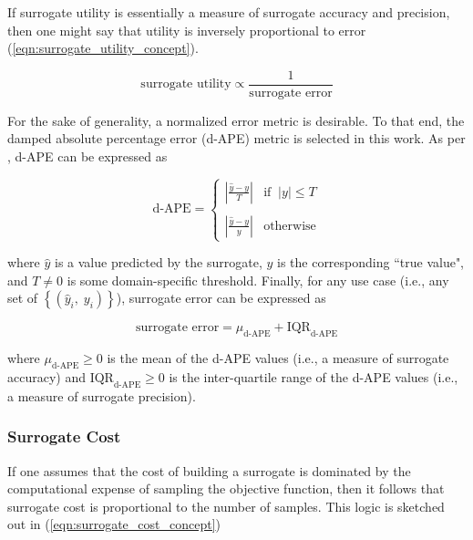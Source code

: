 \documentclass[conference]{IEEEtran}
\begin{document}
If surrogate utility is essentially a measure of surrogate accuracy and precision, then one might say that utility is inversely proportional to error (\ref{eqn:surrogate_utility_concept}).

\begin{equation}
	\textrm{surrogate utility} \propto \frac{1}{\textrm{surrogate error}}
	\label{eqn:surrogate_utility_concept}
\end{equation}

\noindent For the sake of generality, a normalized error metric is desirable. To that end, the damped absolute percentage error (d-APE) metric is selected in this work. As per \cite{Rulff_2024}, d-APE can be expressed as

\begin{equation}
	\textrm{d-APE} = \begin{cases}
		\left|\frac{\widehat{y} - y}{T}\right| & \textrm{if}\;\;|y|\leq T \\
		{} & {} \\
		\left|\frac{\widehat{y} - y}{y}\right| & \textrm{otherwise}
	\end{cases}
	\label{eqn:d-APE}
\end{equation}

\noindent where $\widehat{y}$ is a value predicted by the surrogate, $y$ is the corresponding ``true value", and $T \neq 0$ is some domain-specific threshold. Finally, for any use case (i.e., any set of $\left\{(\widehat{y}_i,\;y_i)\right\}$), surrogate error can be expressed as

\begin{equation}
	\textrm{surrogate error} = \mu_\textrm{d-APE} + \text{IQR}_\textrm{d-APE}
	\label{eqn:surrogate_error}
\end{equation}

\noindent where $\mu_\textrm{d-APE} \geq 0$ is the mean of the d-APE values (i.e., a measure of surrogate accuracy) and $\text{IQR}_\textrm{d-APE} \geq 0$ is the inter-quartile range of the d-APE values (i.e., a measure of surrogate precision).

\subsubsection{Surrogate Cost}

If one assumes that the cost of building a surrogate is dominated by the computational expense of sampling the objective function, then it follows that surrogate cost is proportional to the number of samples. This logic is sketched out in (\ref{eqn:surrogate_cost_concept})
\end{document}
